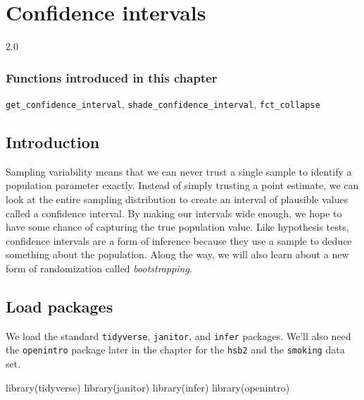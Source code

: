 \documentclass[
]{book}
\newenvironment{Shaded}{\begin{snugshade}}{\end{snugshade}}
\newcommand{\FunctionTok}[1]{\textcolor[rgb]{0.00,0.00,0.00}{#1}}
\newcommand{\NormalTok}[1]{#1}
\begin{document}
\hypertarget{ci}{%
\chapter{Confidence intervals}\label{ci}}

2.0

\hypertarget{functions-introduced-in-this-chapter-11}{%
\subsection*{Functions introduced in this chapter}\label{functions-introduced-in-this-chapter-11}}

\texttt{get\_confidence\_interval}, \texttt{shade\_confidence\_interval}, \texttt{fct\_collapse}

\hypertarget{ci-intro}{%
\section{Introduction}\label{ci-intro}}

Sampling variability means that we can never trust a single sample to identify a population parameter exactly. Instead of simply trusting a point estimate, we can look at the entire sampling distribution to create an interval of plausible values called a confidence interval. By making our intervals wide enough, we hope to have some chance of capturing the true population value. Like hypothesis tests, confidence intervals are a form of inference because they use a sample to deduce something about the population. Along the way, we will also learn about a new form of randomization called \emph{bootstrapping}.

\hypertarget{ci-load}{%
\section{Load packages}\label{ci-load}}

We load the standard \texttt{tidyverse}, \texttt{janitor}, and \texttt{infer} packages. We'll also need the \texttt{openintro} package later in the chapter for the \texttt{hsb2} and the \texttt{smoking} data set.

\begin{Shaded}
\begin{Highlighting}[]
\FunctionTok{library}\NormalTok{(tidyverse)}
\FunctionTok{library}\NormalTok{(janitor)}
\FunctionTok{library}\NormalTok{(infer)}
\FunctionTok{library}\NormalTok{(openintro)}
\end{Highlighting}
\end{Shaded}
\end{document}
